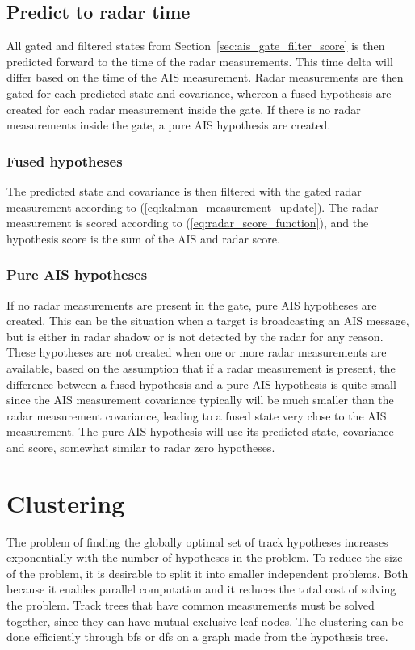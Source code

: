 \subsection{Predict to radar time}
All gated and filtered states from Section~\ref{sec:ais_gate_filter_score} is then predicted forward to  the time of the radar measurements. This time delta will differ based on the time of the AIS measurement. Radar measurements are then gated for each predicted state and covariance, whereon a fused hypothesis are created for each radar measurement inside the gate. If there is no radar measurements inside the gate, a pure AIS hypothesis are created. 

\subsubsection{Fused hypotheses}
The predicted state and covariance is then filtered with the gated radar measurement according to (\ref{eq:kalman_measurement_update}). The radar measurement is scored according to (\ref{eq:radar_score_function}), and the hypothesis score is the sum of the AIS and radar score.

\subsubsection{Pure AIS hypotheses}\label{subsec:pure_ais_hypotheses}
If no radar measurements are present in the gate, pure AIS hypotheses are created. This can be the situation when a target is broadcasting an AIS message, but is either in radar shadow or is not detected by the radar for any reason. These hypotheses are not created when one or more radar measurements are available, based on the assumption that if a radar measurement is present, the difference between a fused hypothesis and a pure AIS hypothesis is quite small since the AIS measurement covariance typically will be much smaller than the radar measurement covariance, leading to a fused state very close to the AIS measurement. The pure AIS hypothesis will use its predicted state, covariance and score, somewhat similar to radar zero hypotheses.

\section{Clustering}
The problem of finding the globally optimal set of track hypotheses increases exponentially with the number of hypotheses in the problem. To reduce the size of the problem, it is desirable to split it into smaller independent problems. Both because it enables parallel computation and it reduces the total cost of solving the problem. Track trees that have common measurements must be solved together, since they can have mutual exclusive leaf nodes. The clustering can be done efficiently through \gls{bfs} or \gls{dfs} on a graph made from the hypothesis tree.

